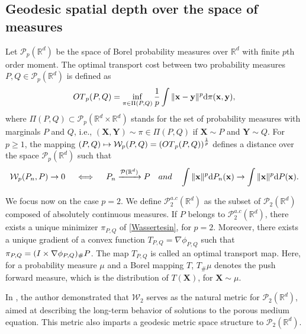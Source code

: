 \documentclass{imsart}
\numberwithin{equation}{section}
\def\R{\mathbb{R}}
\def\x{\mathbf{x}}
\def\y{\mathbf{y}}
\def\X{\mathbf{X}}
\def\Y{\mathbf{Y}}
\def\x{\mathbf x}
\def\y{\mathbf y}
\begin{document}
\subsection{Geodesic spatial depth over the space of measures}\label{subsec:WassersteinGeom}
Let $\mathcal{P}_p(\R^d)$ be the space of Borel probability measures over $\R^d$ with finite $p$th order moment. The optimal transport cost between  two probability measures $P,Q\in \mathcal{P}_p(\R^d)$ is defined as 
\begin{equation}\label{Wassertesin}
	{\rm OT}_p(P,Q)=\inf_{\pi\in \Pi(P,Q) } \frac{1}{p} \int \|\x-\y\|^p \mathrm{d}\pi(\x,\y),
\end{equation}
where $\Pi(P,Q)\subset \mathcal{P}_p(\R^d\times \R^d)$ stands for the set of probability measures  with marginals $P$ and $Q$, i.e., $(\X,\Y)\sim \pi\in \Pi(P,Q)$  if $\X\sim P$ and $\Y\sim Q$. For $p\geq 1$, the mapping $(P,Q)\mapsto \mathcal{W}_p(P,Q)=\left({\rm OT}_p(P,Q)\right)^{\frac{1}{p}}$ defines a distance over the space $\mathcal{P}_p(\R^d)$ such that
$$ \mathcal{W}_p(P_n,P)\to 0 \quad  \iff \quad P_n\xrightarrow{\mathcal{P}(\R^d)}  P \quad {\rm and}\quad  \int \|\x\|^p \mathrm{d} P_n(\x) \to \int \|\x\|^p \mathrm{d} P(\x).  $$



We focus now on the case $p=2$. 
We define $\mathcal{P}^{a.c}_2(\R^d)$ as the subset of $\mathcal{P}_2(\R^d)$ composed of absolutely continuous measures.
If $P$ belongs to $\mathcal{P}^{a.c}_2(\R^d)$, there exists a unique minimizer $\pi_{P,Q}$ of \eqref{Wassertesin}, for $p=2$. Moreover, there exists a unique gradient of a convex function $ T_{P,Q}=\nabla \phi_{P,Q}  $ such that $\pi_{P,Q}=({\rm I}\times \nabla \phi_{P,Q})_{\#} P$.
The map $T_{P,Q}$ is called an optimal transport map.
Here, for a probability measure $\mu$ and a Borel mapping $T$,   $T_\# \mu$ denotes the push forward measure, which is the distribution of $T(\X)$, for $\X\sim \mu$.

In \cite{Otto2001}, the author demonstrated that \( \mathcal{W}_2 \) serves as the natural metric for \( \mathcal{P}_2(\mathbb{R}^d) \), aimed at describing the long-term behavior of solutions to the porous medium equation. This metric also imparts a geodesic metric space structure to \( \mathcal{P}_2(\mathbb{R}^d) \).
\end{document}
